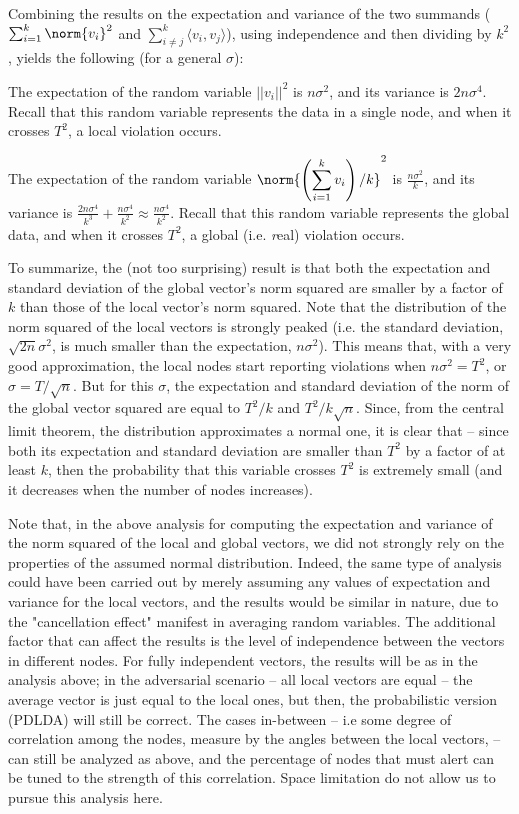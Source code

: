 Combining the results on the expectation and variance of the two summands
($\sum_{i=1}^k \norm{v_i}^2$ and $\sum_{i \neq j}^k \langle v_i , v_j\rangle$),
using independence and then dividing by $k^2$, yields the following (for a 
general $\sigma$):

\begin{lemma}
\label{lemma:Gaussian}
The expectation of the random variable $||v_i||^2$ is $n\sigma^2$, and its
variance is $2n\sigma^4$. Recall that this random variable represents the
data in a single node, and when it crosses $T^2$, a local violation occurs. 


The expectation of the random variable
\(\norm{\left(\displaystyle \sum_{i=1}^k v_i\right)/k}^2\) is
$\frac{n\sigma^2}{k}$, and its variance is 
$\frac{2n\sigma^4}{k^3} + \frac{n\sigma^4}{k^2} \approx \frac{n\sigma^4}{k^2}$.
Recall that this random variable represents the
global data, and when it crosses $T^2$, a global (i.e. {\emph real}) violation occurs. 
\end{lemma}

To summarize, the (not too surprising) result is that both the expectation and
standard deviation of the global vector's norm squared are smaller by a factor of $k$ than those of the local vector's norm squared. Note that the distribution of the norm
squared of the local vectors is strongly peaked (i.e. the standard deviation,
$\sqrt{2n}\sigma^2$, is much smaller than the expectation, $n\sigma^2$). This means
that, with a very good approximation, the local nodes start reporting violations
when $n\sigma^2=T^2$, or $\sigma = T/\sqrt{n}$. But for this $\sigma$, the 
expectation and standard deviation of the norm of the global vector squared
are equal to $T^2/k$ and $T^2/k\sqrt{n}$. Since, from the central limit theorem,
the distribution approximates a normal one, it is clear that -- since both its
expectation and standard deviation are smaller than $T^2$ by a factor of at least
$k$, then the probability that this variable crosses $T^2$ is extremely small (and
it decreases when the number of nodes increases).

Note that, in the above analysis for computing the expectation and variance
of the norm squared of the local and global vectors, we did not strongly rely
on the properties of the assumed normal distribution. Indeed, the same type
of analysis could have been carried out by merely assuming any values of
expectation and variance for the local vectors, and the results would be
similar in nature, due to the "cancellation effect" manifest in averaging
random variables. The additional factor that can affect the results is the
level of independence between the vectors in different nodes. For fully
independent vectors, the results will be as in the analysis above; in the
adversarial scenario -- all local vectors are equal -- the average vector is just
equal to the local ones, but then, the probabilistic version (PDLDA) will
still be correct. The cases in-between -- i.e some degree of correlation
among the nodes, 
measure by the angles between the local vectors, -- can still be analyzed
as above, and the percentage of nodes that must alert can be tuned to
the strength of this correlation. Space limitation do not allow us to 
pursue this analysis here.



